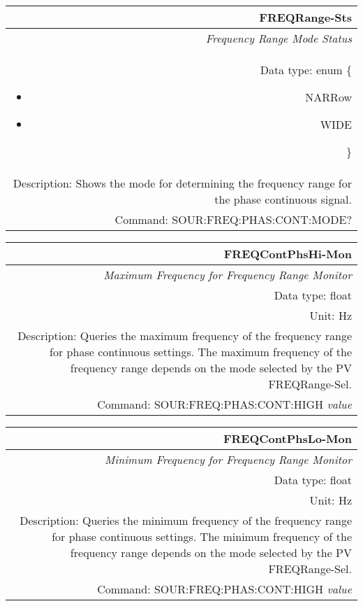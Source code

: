 \documentclass[openany]{article}
\begin{document}
		\begin{tabular}{N}
			\hline
			\bfseries FREQRange-Sts \\ \hline
			\emph{Frequency Range Mode Status} \\
			Data type: enum \{\begin{itemize}[noitemsep]
				\small
				\item[] NARRow
				\item[] WIDE
			\end{itemize}\} \\ 
			Description: Shows the mode for determining the frequency range for the phase continuous signal. \\
			Command: SOUR:FREQ:PHAS:CONT:MODE? \\

		\end{tabular}
%
		\begin{tabular}{N}
			\hline
			\bfseries FREQContPhsHi-Mon \\ \hline
			\emph{Maximum Frequency for Frequency Range Monitor} \\
			Data type: float \\
			Unit: Hz \\
			Description: Queries the maximum frequency of the frequency range for phase continuous settings. The maximum frequency of the frequency range depends on the mode selected by the PV FREQRange-Sel.\\
			Command: SOUR:FREQ:PHAS:CONT:HIGH \emph{value} \\
			
		\end{tabular}
%
		\begin{tabular}{N}
			\hline
			\bfseries FREQContPhsLo-Mon \\ \hline
			\emph{Minimum Frequency for Frequency Range Monitor} \\
			Data type: float \\
			Unit: Hz \\
			Description: Queries the minimum frequency of the frequency range for phase continuous settings. The minimum frequency of the frequency range depends on the mode selected by the PV FREQRange-Sel.\\
			Command: SOUR:FREQ:PHAS:CONT:HIGH \emph{value} \\
			
		\end{tabular}
\end{document}
